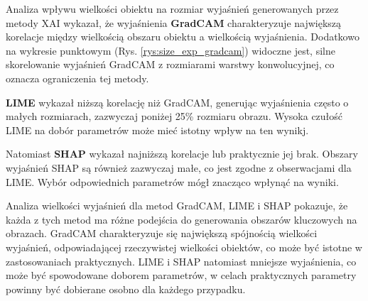 Analiza wpływu wielkości obiektu na rozmiar wyjaśnień generowanych przez metody XAI wykazał, że wyjaśnienia \textbf{GradCAM} charakteryzuje największą korelacje między wielkością obszaru obiektu a wielkością wyjaśnienia.
Dodatkowo na wykresie punktowym (Rys. \ref{rys:size_exp_gradcam}) widoczne jest, silne skorelowanie wyjaśnień GradCAM z rozmiarami warstwy konwolucyjnej, co oznacza ograniczenia tej metody.

\textbf{LIME} wykazał niższą korelację niż GradCAM, generując wyjaśnienia często o małych rozmiarach, zazwyczaj poniżej 25\% rozmiaru obrazu.
Wysoka czułość LIME na dobór parametrów może mieć istotny wpływ na ten wynikj.

Natomiast \textbf{SHAP} wykazał najniższą korelacje lub praktycznie jej brak.
Obszary wyjaśnień SHAP są również zazwyczaj małe, co jest zgodne z obserwacjami dla LIME.
Wybór odpowiednich parametrów mógł znacząco wpłynąć na wyniki.

\vspace{1cm}
Analiza wielkości wyjaśnień dla metod GradCAM, LIME i SHAP pokazuje, że każda z tych metod ma różne podejścia do generowania obszarów kluczowych na obrazach.
GradCAM charakteryzuje się największą spójnością wielkości wyjaśnień, odpowiadającej rzeczywistej wielkości obiektów, co może być istotne w zastosowaniach praktycznych.
LIME i SHAP natomiast mniejsze wyjaśnienia, co może być spowodowane doborem parametrów, w celach praktycznych parametry powinny być dobierane osobno dla każdego przypadku.

